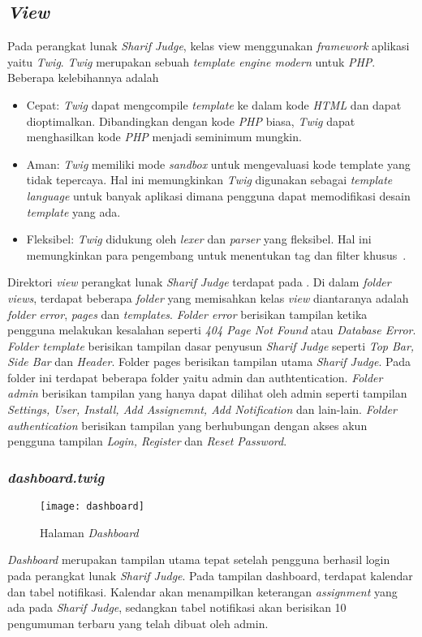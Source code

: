 \subsection{\textit{View}}
Pada perangkat lunak \textit{\textit{Sharif Judge}}, kelas view menggunakan \textit{framework} aplikasi yaitu \textit{Twig}. \textit{Twig} merupakan sebuah \textit{template engine modern} untuk \textit{PHP}. Beberapa kelebihannya adalah
\begin{itemize}
	\item Cepat: \textit{Twig} dapat mengcompile \textit{template} ke dalam kode \textit{HTML} dan dapat dioptimalkan. Dibandingkan dengan kode \textit{PHP} biasa, \textit{Twig} dapat menghasilkan kode \textit{PHP} menjadi seminimum mungkin.
	\item Aman: \textit{Twig} memiliki mode \textit{sandbox} untuk mengevaluasi kode template yang tidak tepercaya. Hal ini memungkinkan \textit{Twig} digunakan sebagai \textit{template language} untuk banyak aplikasi dimana pengguna dapat memodifikasi desain \textit{template} yang ada.
	\item Fleksibel: \textit{Twig} didukung oleh \textit{lexer} dan \textit{parser} yang fleksibel. Hal ini memungkinkan para pengembang untuk menentukan tag dan filter khusus~\cite{fabien:09:twig}.
\end{itemize}

Direktori \textit{view} perangkat lunak \textit{Sharif Judge} terdapat pada . Di dalam \textit{folder views}, terdapat beberapa \textit{folder} yang memisahkan kelas \textit{view} diantaranya adalah \textit{folder error}, \textit{pages} dan \textit{templates}. \textit{Folder error} berisikan tampilan ketika pengguna melakukan kesalahan seperti\textit{ 404 Page Not Found} atau \textit{Database Error}. \textit{Folder template} berisikan tampilan dasar penyusun \textit{Sharif Judge} seperti \textit{Top Bar, Side Bar} dan \textit{Header}. Folder pages berisikan tampilan utama \textit{\textit{Sharif Judge}}. Pada folder ini terdapat beberapa folder yaitu admin dan authtentication. \textit{Folder admin} berisikan tampilan yang hanya dapat dilihat oleh admin seperti tampilan \textit{Settings, User, Install, Add Assignemnt, Add Notification} dan lain-lain. \textit{Folder authentication} berisikan tampilan yang berhubungan dengan akses akun pengguna tampilan \textit{Login, Register} dan \textit{Reset Password}.

\subsubsection{\textit{dashboard.twig}}
\begin{figure}[H]
	\centering  
	\texttt{[image: dashboard]}  
	\caption[Halaman \textit{Dashboard}]{Halaman \textit{Dashboard}} 
	\label{fig:dashboard} 
\end{figure} 
\textit{Dashboard} merupakan tampilan utama tepat setelah pengguna berhasil login pada perangkat lunak \textit{Sharif Judge}. Pada tampilan dashboard, terdapat kalendar dan tabel notifikasi. Kalendar akan menampilkan keterangan \textit{assignment} yang ada pada \textit{Sharif Judge}, sedangkan tabel notifikasi akan berisikan 10 pengumuman terbaru yang telah dibuat oleh admin.

